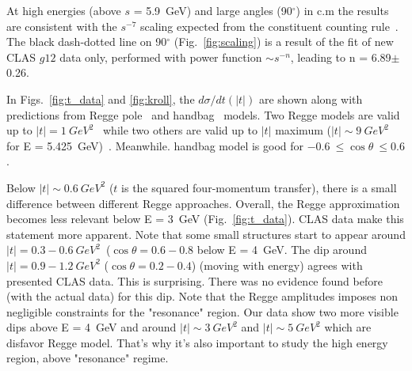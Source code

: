 \documentclass[aps,prc,onecolumn,floatfix,showpacs,preprintnumbers,amsmath,amssymb,superscriptaddress]{revtex4-1}
\begin{document}
At high energies (above $s$ = 5.9~GeV) and large angles 
(90$^\circ$) in c.m the results are consistent with the 
$s^{-7}$ scaling expected from the constituent counting 
rule~\cite{stan}. The black dash-dotted line on 90$^\circ$ 
(Fig.~\ref{fig:scaling}) is a result of the fit of new CLAS 
$g12$ data only, performed with power function $\sim s^{-n}$, 
leading to n = 6.89$\pm$0.26.

In Figs.~\ref{fig:t_data} and \ref{fig:kroll}, the 
$d\sigma/dt(|t|)$ are shown along with predictions from Regge 
pole~\cite{Goldstein,Laget,Mathieu,Donnachie} and 
handbag~\cite{Kroll} models. Two Regge models are valid up to
$|t|=1~GeV^2$~\cite{Mathieu,Donnachie} while two others are
valid up to $|t|$ maximum ($|t|\sim 9~GeV^2$ for E = 
5.425~GeV)~\cite{Goldstein,Laget}.  Meanwhile. handbag model
is good for $-0.6~\leq \cos\theta~\leq 0.6$.

Below $|t|\sim 0.6~GeV^2$ ($t$ is the squared four-momentum 
transfer), there is a small difference between different Regge 
approaches.  Overall, the Regge approximation becomes less 
relevant below E = 3~GeV (Fig.~\ref{fig:t_data}).  CLAS data 
make this statement more apparent.  Note that some small 
structures start to appear around $|t| = 0.3-0.6~GeV^2$~($\cos\theta 
= 0.6-0.8$ below E = 4~GeV.  The dip around $|t| = 0.9-1.2~GeV^2$ 
($\cos\theta = 0.2-0.4$) (moving with energy) agrees with presented 
CLAS data.  This is surprising.  There was no evidence found before 
(with the actual data) for this dip. Note that the Regge amplitudes 
imposes non negligible constraints for the "resonance" region.  Our 
data show two more visible dips above E = 4~GeV and around $|t|\sim 
3~GeV^2$ and $|t|\sim 5~GeV^2$ which are disfavor Regge model.  
That's why it's also important to study the high energy region, 
above "resonance" regime.
\end{document}
